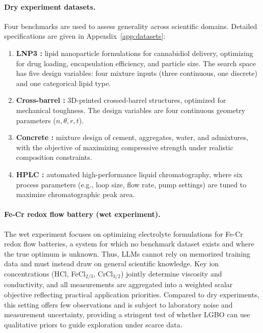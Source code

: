 \documentclass{article} %
\begin{document}
\paragraph{Dry experiment datasets.}  
Four benchmarks are used to assess generality across scientific domains. Detailed specifications are given in Appendix~\ref{app:datasets}:  
\begin{enumerate}[label=\arabic*), leftmargin=*]
\item \textbf{LNP3 \citep{chen2022optimizationlnp3}:} lipid nanoparticle formulations for cannabidiol delivery, optimizing for drug loading, encapsulation efficiency, and particle size.
The search space has five design variables: four mixture inputs (three continuous, one discrete) and one categorical lipid type.

\item \textbf{Cross-barrel \citep{gongora2020bayesiancross}:} 3D-printed crossed-barrel structures, optimized for mechanical toughness.  
The design variables are four continuous geometry parameters ($n,\theta,r,t$).

\item \textbf{Concrete \citep{concrete}:} mixture design of cement, aggregates, water, and admixtures, 
with the objective of maximizing compressive strength under realistic composition constraints. \item \textbf{HPLC \citep{hase2021olympushplc}:} automated high-performance liquid chromatography, 
where six process parameters (e.g., loop size, flow rate, pump settings) are tuned to maximize chromatographic peak area.  
\end{enumerate}
\paragraph{Fe-Cr redox flow battery (wet experiment).}  
The wet experiment focuses on optimizing electrolyte formulations for Fe-Cr redox flow batteries, a system for which no benchmark dataset exists and where the true optimum is unknown. Thus, LLMs cannot rely on memorized training data and must instead draw on general scientific knowledge. Key ion concentrations (HCl, FeCl$_{2/3}$, CrCl$_{3/2}$) jointly determine viscosity and conductivity, and all measurements are aggregated into a weighted scalar objective reflecting practical application priorities. Compared to dry experiments, this setting offers few observations and is subject to laboratory noise and measurement uncertainty, providing a stringent test of whether LGBO can use qualitative priors to guide exploration under scarce data.
\end{document}
